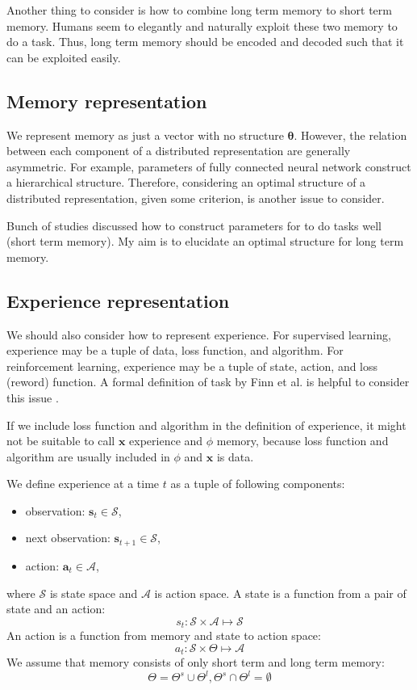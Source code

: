\documentclass[12pt]{article}
\begin{document}
Another thing to consider is how to combine long term memory to short term memory. 
Humans seem to elegantly and naturally exploit these two memory to do a task. Thus, 
long term memory should be encoded and decoded such that it can be exploited easily. 

\subsection{Memory representation}
We represent memory as just a vector with no structure $\bm{\theta}$. However, 
the relation between each component of a distributed representation are generally asymmetric. 
For example, parameters of fully connected neural network construct a hierarchical structure. 
Therefore, considering an optimal structure of a distributed representation, given 
some criterion, is another issue to consider. 

Bunch of studies discussed how to construct parameters for to do tasks well (short term memory). 
My aim is to elucidate an optimal structure for long term memory. 

\subsection{Experience representation}
We should also consider how to represent experience. For supervised learning, experience may be 
a tuple of data, loss function, and algorithm. For reinforcement learning, experience may be a tuple 
of state, action, and loss (reword) function. A formal definition of task by Finn et al. is 
helpful to consider this issue \cite{Finn17}. 

If we include loss function and algorithm in the definition of experience, it might not be 
suitable to call $\bm{x}$ experience and $\phi$ memory, because loss function and algorithm 
are usually included in $\phi$ and $\bm{x}$ is data.

We define experience at a time $t$ as a tuple of following components:
\begin{itemize}
    \item observation: $\bm{s}_t \in \mathcal{S}$,
    \item next observation: $\bm{s}_{t+1} \in \mathcal{S}$,
    \item action: $\bm{a}_t \in \mathcal{A}$,
\end{itemize}
where $\mathcal{S}$ is state space and $\mathcal{A}$ is action space. 
A state is a function from a pair of state and an action:
\begin{equation}
    s_t: \mathcal{S} \times \mathcal{A} \mapsto \mathcal{S}
\end{equation}
An action is a function from memory and state to action space:
\begin{equation}
    a_t: \mathcal{S} \times \Theta \mapsto \mathcal{A}
\end{equation}
We assume that memory consists of only short term and long term memory:
\begin{equation}
    \Theta = \Theta^s \cup \Theta^l, \Theta^s \cap \Theta^l = \emptyset
\end{equation}
\end{document}
